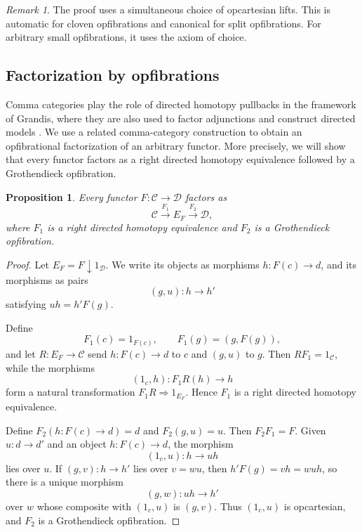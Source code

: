 \documentclass[12pt]{amsart}
\newtheorem{proposition}[teo]{Proposition}
\theoremstyle{definition}
\theoremstyle{remark}
\newtheorem{remark}{Remark}
\numberwithin{figure}{section}%
\newcommand{\CC}{\mathcal{C}}
\newcommand{\Dc}{\mathcal{D}}
\begin{document}
\begin{remark}
The proof uses a simultaneous choice of opcartesian lifts. This is
automatic for cloven opfibrations and canonical for split opfibrations.
For arbitrary small opfibrations, it uses the axiom of choice.
\end{remark}

\subsection{Factorization by opfibrations}\label{subsec:factorization_pfibration}

Comma categories play the role of directed homotopy pullbacks in the
framework of Grandis, where they are also used to factor adjunctions and
construct directed models
\cite[Sections~1.6 and~4.4]{GrandisShape}. We use a related comma-category
construction to obtain an opfibrational factorization of an arbitrary
functor. More precisely, we will show that every functor factors as a right directed homotopy equivalence followed by a Grothendieck opfibration.

\begin{proposition}\label{prop:directed_opfibration_factorization}
Every functor \(F\colon\CC\to\Dc\) factors as
\[
\CC\xrightarrow{F_1}E_F\xrightarrow{F_2}\Dc,
\]
where \(F_1\) is a right directed homotopy equivalence and \(F_2\) is a
Grothendieck opfibration.
\end{proposition}

\begin{proof}
Let \(E_F=F\downarrow1_\Dc\). We write its objects as morphisms
\(h\colon F(c)\to d\), and its morphisms as pairs
\[
(g,u)\colon h\longrightarrow h'
\]
satisfying \(uh=h'F(g)\).

Define
\[
F_1(c)=1_{F(c)},
\qquad
F_1(g)=(g,F(g)),
\]
and let \(R\colon E_F\to\CC\) send \(h\colon F(c)\to d\) to \(c\) and
\((g,u)\) to \(g\). Then \(RF_1=1_\CC\), while the morphisms
\[
(1_c,h)\colon F_1R(h)\longrightarrow h
\]
form a natural transformation \(F_1R\Rightarrow1_{E_F}\). Hence \(F_1\)
is a right directed homotopy equivalence.

Define \(F_2(h\colon F(c)\to d)=d\) and \(F_2(g,u)=u\). Then
\(F_2F_1=F\). Given \(u\colon d\to d'\) and an object
\(h\colon F(c)\to d\), the morphism
\[
(1_c,u)\colon h\longrightarrow uh
\]
lies over \(u\). If \((g,v)\colon h\to h'\) lies over \(v=wu\), then
\(h'F(g)=vh=wuh\), so there is a unique morphism
\[
(g,w)\colon uh\longrightarrow h'
\]
over \(w\) whose composite with \((1_c,u)\) is \((g,v)\). Thus
\((1_c,u)\) is opcartesian, and \(F_2\) is a Grothendieck opfibration.
\end{proof}
\end{document}
